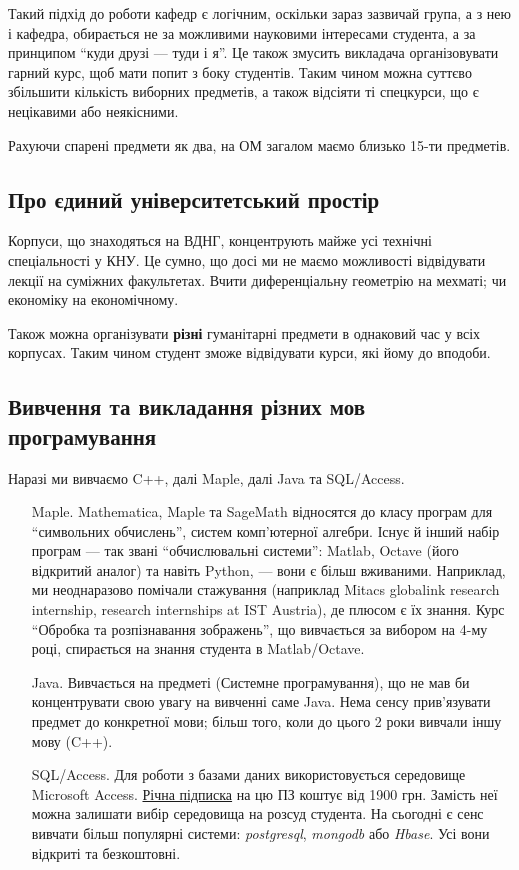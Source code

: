 \documentclass[14pt, a4paper]{extarticle}  %
\begin{document}
Такий підхід до роботи кафедр є логічним, оскільки зараз зазвичай група, а з нею і кафедра, обирається не за можливими науковими інтересами студента, а за принципом ``куди друзі --- туди і я''. Це також змусить викладача організовувати гарний курс, щоб мати попит з боку студентів. Таким чином можна суттєво збільшити кількість виборних предметів, а також відсіяти ті спецкурси, що є нецікавими або неякісними.

Рахуючи спарені предмети як два, на ОМ загалом маємо близько 15-ти предметів. 

\subsection{Про єдиний університетський простір}
\label{common_space}
Корпуси, що знаходяться на ВДНГ, концентрують майже усі технічні спеціальності у КНУ. Це сумно, що досі ми не маємо можливості відвідувати лекції на суміжних факультетах. Вчити диференціальну геометрію на мехматі; чи економіку на економічному.

Також можна організувати \textbf{різні} гуманітарні предмети в однаковий час у всіх корпусах. Таким чином студент зможе відвідувати курси, які йому до вподоби. 

\subsection{Вивчення та викладання різних мов програмування}
\label{Languages}
Наразі ми вивчаємо C++, далі Maple, далі Java та SQL/Access. 
\begin{itemize}
    \item [Maple.] Mathematica, Maple та SageMath відносятся до класу програм для ``символьних обчислень'', систем комп'ютерної алгебри. Існує й інший набір програм --- так звані ``обчислювальні системи'': Matlab, Octave (його відкритий аналог) та навіть Python, --- вони є більш вживаними. Наприклад, ми неоднаразово помічали стажування (наприклад Mitacs globalink research internship, research internships at IST Austria), де плюсом є їх знання. Курс ``Обробка та розпізнавання зображень'', що вивчається за вибором на 4-му році, спирається на знання студента в Matlab/Octave. 
    
    \item [Java.] Вивчається на предметі (Системне програмування), що не мав би концентрувати свою увагу на вивченні саме Java. Нема сенсу прив'я\-зувати предмет до конкретної мови; більш того, коли до цього 2 роки вивчали іншу мову (C++).  
    
    \item [SQL/Access.] Для роботи з базами даних використовується середовище Microsoft Access. \href{https://products.office.com/uk-UA/buy/office}{Річна підписка} на цю ПЗ коштує від 1900 грн. Замість неї можна залишати вибір середовища на розсуд студента. На сьогодні є сенс вивчати більш популярні системи: \textit{postgresql}, \textit{mongodb} або \textit{Hbase}. Усі вони відкриті та безкоштовні. 
\end{itemize}
\end{document}

